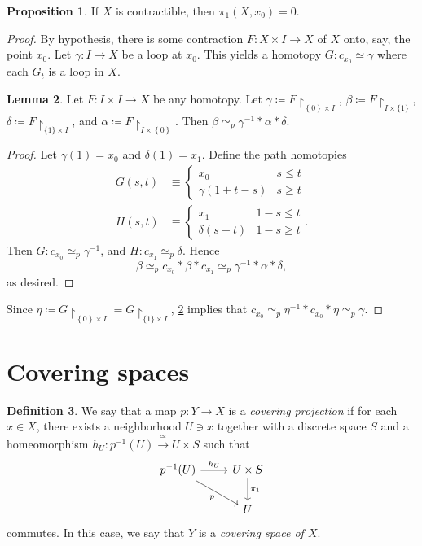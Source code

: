 \documentclass[10pt,letterpaper,cm]{nupset}
\theoremstyle{definition}
\newtheorem{definition}{Definition}[subsection]
\theoremstyle{theorem}
\newtheorem{lemma}[definition]{Lemma}
\newtheorem{prop}[definition]{Proposition}
\theoremstyle{remark}
\newcommand{\1}{\mathbb{1}}
\newcommand{\0}{\vec 0}
\begin{document}
\begin{prop}
If $X$ is contractible, then $\pi_1\left(X, x_0\right) = 0$.
\end{prop}
\begin{proof}
By hypothesis, there is some contraction $F: X \times I \to X$ of $X$ onto, say, the point $x_0$. Let $\gamma : I \to X$ be a loop at $x_0$. This yields a homotopy $G: c_{x_0} \simeq \gamma$ where each $G_t$ is a loop in $X$.
\begin{lemma}\label{chom}
Let $F: I \times I \to X$ be  any homotopy. Let $\gamma \coloneqq  F\restriction_{\left\{0\right\} \times I}$, $\beta \coloneqq  F\restriction_{I \times \{1\}}$, $\delta \coloneqq  F\restriction_{\{1\} \times I}$, and $\alpha \coloneqq F \restriction_{I \times \left\{0\right\}}$. Then $\beta \simeq_p \gamma^{-1} \ast \alpha \ast \delta$. 
\end{lemma}
\begin{proof} Let $\gamma(1) = x_0$ and $\delta(1) = x_1$. Define the path homotopies 
\begin{align*}
G(s,t) &\equiv \begin{cases} x_0 & s\leq t \\ \gamma(1 + t-s) & s \geq t   \end{cases}
\\ H(s,t) & \equiv \begin{cases}  x_1 & 1-s \leq t \\ \delta(s+t) & 1-s \geq t  \end{cases} .
\end{align*} Then $G: c_{x_0} \simeq_p \gamma^{-1}$, and $H: c_{x_1} \simeq_p \delta$. Hence $$\beta \simeq_p c_{x_0} \ast \beta \ast c_{x_1} \simeq_p \gamma^{-1} \ast \alpha \ast \delta, $$ as desired. 
\end{proof}
 Since $\eta \coloneqq  G\restriction_{\left\{0\right\} \times I} = G \restriction_{\{1\} \times I}$, \cref{chom} implies that $c_{x_0} \simeq_p \eta^{-1} \ast c_{x_0} \ast \eta \simeq_p \gamma$. 
\end{proof}


\section{Covering spaces} 

\begin{definition}
We say that a map $p: Y \to X$ is a \textit{covering projection} if for each $x\in X$, there exists a neighborhood $U\ni x$ together with a discrete space $S$ and a homeomorphism $h_U : p^{-1}(U) \overset{\cong}{\longrightarrow} U \times S$  such that 
\[
\begin{tikzcd}
p^{-1}(U) \arrow[rd, "p"'] \arrow[r, "h_U"] & U \times S \arrow[d, "\pi_1"] \\
 & U
\end{tikzcd}
\] commutes. In this case, we say that $Y$ is a \textit{covering space of $X$}.
\end{definition}
\end{document}
